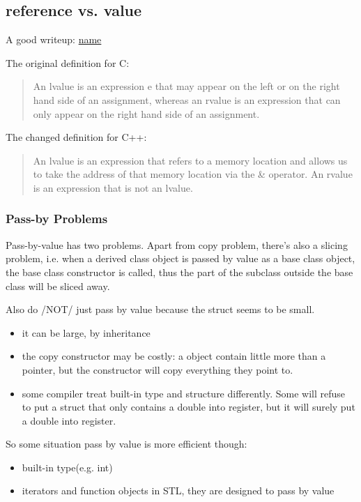 \subsection{reference vs. value}
A good writeup: \href{http://thbecker.net/articles/rvalue_references/section_01.html}{name}

The original definition for C:
\begin{quote}
An lvalue is an expression e that may appear on the left or on the right hand side of an assignment,
whereas an rvalue is an expression that can only appear on the right hand side of an assignment.
\end{quote}

The changed definition for C++:
\begin{quote}
An lvalue is an expression that refers to a memory location and allows us to take the address of that memory location via the \& operator.
An rvalue is an expression that is not an lvalue.
\end{quote}

\subsubsection{Pass-by Problems}
Pass-by-value has two problems.  Apart from copy problem, there's also
a slicing problem, i.e. when a derived class object is passed by value
as a base class object, the base class constructor is called, thus the
part of the subclass outside the base class will be sliced away.

Also do /NOT/ just pass by value because the struct seems to be small.
\begin{itemize}
\item it can be large, by inheritance
\item the copy constructor may be costly: a object contain little more
  than a pointer, but the constructor will copy everything they point
  to.
\item some compiler treat built-in type and structure differently.
  Some will refuse to put a struct that only contains a double into
  register, but it will surely put a double into register.
\end{itemize}
So some situation pass by value is more efficient though:
\begin{itemize}
\item built-in type(e.g. int)
\item iterators and function objects in STL, they are designed to pass by value
\end{itemize}

